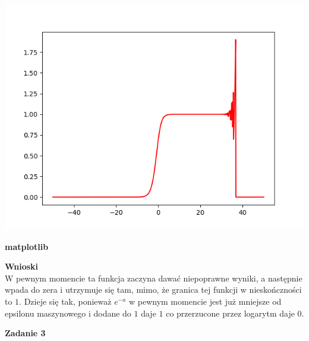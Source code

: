 \documentclass{article}
\begin{document}
\begin{center}
	\includegraphics[scale=0.7]{zadanie2_python/plot.png}

	\textbf{matplotlib}
\end{center}

\noindent \textbf{Wnioski} \\
W pewnym momencie ta funkcja zaczyna dawać niepoprawne wyniki, a następnie
wpada do zera i utrzymuje się tam, mimo, że granica tej funkcji w nieskończności
to $1$. Dzieje się tak, ponieważ $e^{-a}$ w pewnym momencie jest już mniejsze od
epsilonu maszynowego i dodane do $1$ daje $1$ co przerzucone przez logarytm daje $0$.

\pagebreak

\noindent \textbf{\large Zadanie 3}
\end{document}
